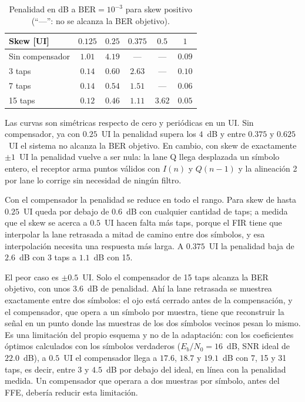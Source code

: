 \begin{table}[H]
\centering
\small
\begin{tabular}{lccccc}
\toprule
Skew [UI] & $0.125$ & $0.25$ & $0.375$ & $0.5$ & $1$ \\
\midrule
Sin compensador & $1.01$ & $4.19$ & --- & --- & $0.09$ \\
3 taps          & $0.14$ & $0.60$ & $2.63$ & --- & $0.10$ \\
7 taps          & $0.14$ & $0.54$ & $1.51$ & --- & $0.06$ \\
15 taps         & $0.12$ & $0.46$ & $1.11$ & $3.62$ & $0.05$ \\
\bottomrule
\end{tabular}
\caption{Penalidad en dB a $\mathrm{BER} = 10^{-3}$ para skew positivo
(``---'': no se alcanza la BER objetivo).}
\label{tab:ej4}
\end{table}

Las curvas son simétricas respecto de cero y periódicas en un UI. Sin
compensador, ya con $0.25$~UI la penalidad supera los $4$~dB y entre
$0.375$ y $0.625$~UI el sistema no alcanza la BER objetivo. En cambio, con
skew de exactamente $\pm1$~UI la penalidad vuelve a ser nula: la lane Q
llega desplazada un símbolo entero, el receptor arma puntos válidos con
$I(n)$ y $Q(n-1)$ y la alineación 2 por lane lo corrige sin necesidad de
ningún filtro.

Con el compensador la penalidad se reduce en todo el rango. Para skew de
hasta $0.25$~UI queda por debajo de $0.6$~dB con cualquier cantidad de
taps; a medida que el skew se acerca a $0.5$~UI hacen falta más taps,
porque el FIR tiene que interpolar la lane retrasada a mitad de camino
entre dos símbolos, y esa interpolación necesita una respuesta más larga.
A $0.375$~UI la penalidad baja de $2.6$~dB con 3 taps a $1.1$~dB con 15.

El peor caso es $\pm0.5$~UI. Solo el compensador de 15 taps alcanza la
BER objetivo, con unos $3.6$~dB de penalidad. Ahí la lane retrasada se
muestrea exactamente entre dos símbolos: el ojo está cerrado antes de la
compensación, y el compensador, que opera a un símbolo por muestra, tiene
que reconstruir la señal en un punto donde las muestras de los dos
símbolos vecinos pesan lo mismo. Es una limitación del propio esquema y
no de la adaptación: con los coeficientes óptimos calculados con los
símbolos verdaderos ($E_b/N_0 = 16$~dB, SNR ideal de $22.0$~dB), a
$0.5$~UI el compensador llega a $17.6$, $18.7$ y $19.1$~dB con 7, 15 y 31
taps, es decir, entre $3$ y $4.5$~dB por debajo del ideal, en línea con la
penalidad medida. Un compensador que operara a dos muestras por símbolo,
antes del FFE, debería reducir esta limitación.

